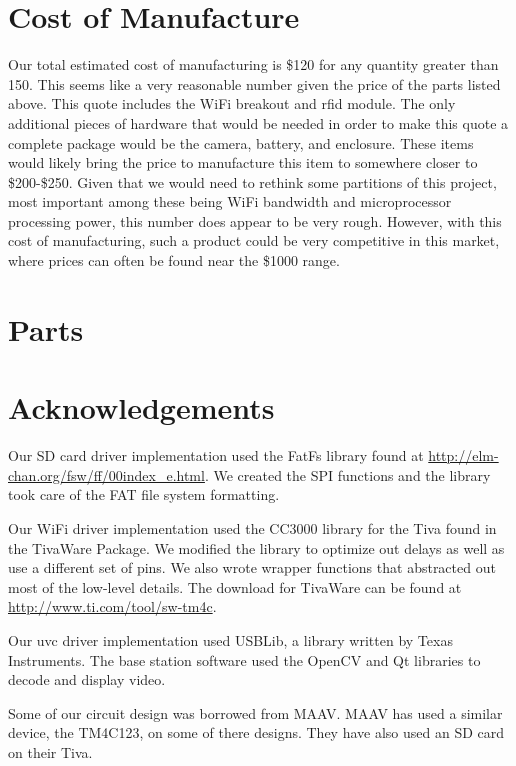 \documentclass[12pt]{article}
\begin{document}
\section{Cost of Manufacture}
Our total estimated cost of manufacturing is \$120 for any quantity greater
than 150. This seems like a very reasonable number given the price of the parts
listed above. This quote includes the WiFi breakout and \gls{rfid} module. The
only additional pieces of hardware that would be needed in order to make this
quote a complete package would be the camera, battery, and enclosure. These
items would likely bring the price to manufacture this item to somewhere closer
to \$200-\$250. Given that we would need to rethink some partitions of this
project, most important among these being WiFi bandwidth and microprocessor
processing power, this number does appear to be very rough. However, with this
cost of manufacturing, such a product could be very competitive in this market,
where prices can often be found near the \$1000 range.

\section{Parts}

\section{Acknowledgements}

Our SD card driver implementation used the FatFs library found at
\url{http://elm-chan.org/fsw/ff/00index\_e.html}. We created the SPI functions
and the library took care of the FAT file system formatting.

Our WiFi driver implementation used the CC3000 library for the Tiva found in
the TivaWare Package. We modified the library to optimize out delays as well as
use a different set of pins. We also wrote wrapper functions that abstracted
out most of the low-level details. The download for TivaWare can be found at
\url{http://www.ti.com/tool/sw-tm4c}.

Our \gls{uvc} driver implementation used USBLib, a library written by Texas
Instruments. The base station software used the OpenCV and Qt libraries to
decode and display video.

Some of our circuit design was borrowed from MAAV. MAAV has used a similar
device, the TM4C123, on some of there designs. They have also used an SD card
on their Tiva.
\end{document}
